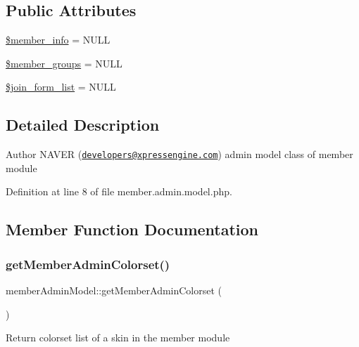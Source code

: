 \subsection*{Public Attributes}
\begin{DoxyCompactItemize}
\item 
\hyperlink{classmemberAdminModel_a4d4a6cc79e642c4dfabcf5f6666991b2}{\$member\+\_\+info} = N\+U\+LL
\item 
\hyperlink{classmemberAdminModel_a4147285c4d6a90b6d73c2d4f2b974b3b}{\$member\+\_\+groups} = N\+U\+LL
\item 
\hyperlink{classmemberAdminModel_a24bd367796a7bc111c649ce71502f30d}{\$join\+\_\+form\+\_\+list} = N\+U\+LL
\end{DoxyCompactItemize}


\subsection{Detailed Description}
\begin{DoxyAuthor}{Author}
N\+A\+V\+ER (\href{mailto:developers@xpressengine.com}{\tt developers@xpressengine.\+com}) admin model class of member module 
\end{DoxyAuthor}


Definition at line 8 of file member.\+admin.\+model.\+php.



\subsection{Member Function Documentation}
\mbox{\label{classmemberAdminModel_a3f52ba31859fdc224dd0ac50495e450c}} 
\subsubsection{\texorpdfstring{get\+Member\+Admin\+Colorset()}{getMemberAdminColorset()}}
{\footnotesize\ttfamily member\+Admin\+Model\+::get\+Member\+Admin\+Colorset (\begin{DoxyParamCaption}{ }\end{DoxyParamCaption})}

Return colorset list of a skin in the member module

